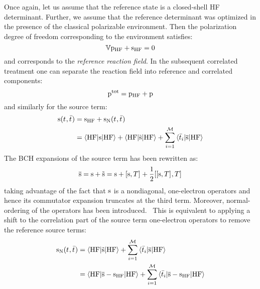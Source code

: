 Once again, let us assume that the reference state is a closed-shell
\acrshort{HF} determinant. Further, we assume that the reference determinant
was optimized in the presence of the classical polarizable environment.
Then the polarization degree of freedom corresponding to the environment
satisfies:
\begin{equation}
  \mathbb{V}\mathrm{p}_\mathrm{HF} + \mathrm{s}_\mathrm{HF} = 0
\end{equation}
and corresponds to the \emph{reference reaction field}.
In the subsequent correlated treatment one can separate the reaction
field into reference and correlated components:
\begin{equation}
  \mathrm{p}^\mathrm{tot} = \mathrm{p}_\mathrm{HF} + \mathrm{p}
\end{equation}
and similarly for the source term:
\begin{equation}
  \begin{aligned}
\mathrm{s}(t_{}, \bar{t}_{}) &= \mathrm{s}_\mathrm{HF} + \mathrm{s}_{\mathrm{N}}(t_{}, \bar{t}_{}) \\
                     &=
    \braket{\mathrm{HF} | \mathrm{s} | \mathrm{HF}}
  + \braket{\mathrm{HF} | \tilde{\mathrm{s}} | \mathrm{HF}}
  + \sum_{i=1}^{\mathcal{M}}\braket{\bar{t}_{i} | \overline{\mathrm{s}} | \mathrm{HF}}
  \end{aligned}
\end{equation}
The \acrshort{BCH} expansions of the source term has been rewritten as:
\begin{equation}
  \overline{\mathrm{s}} = \mathrm{s} + \tilde{\mathrm{s}} = \mathrm{s} + [ \mathrm{s}, T ]^{}
  + \frac{1}{2}[ [ \mathrm{s}, T ]^{}, T ]^{}
\end{equation}
taking advantage of the fact that $\mathrm{s}$ is a
nondiagonal, one-electron operators and hence its commutator
expansion truncates at the third term. Moreover, normal-ordering of the
operators has been introduced.~\autocite{Crawford2000-ey, Shavitt2009-mr}
This is equivalent to applying a shift to the correlation part of the
source term one-electron operators to remove the reference source terms:
\begin{equation}
  \begin{aligned}
    \mathrm{s}_{\mathrm{N}}(t_{}, \bar{t}_{})
  &=
   \braket{\mathrm{HF} | \tilde{\mathrm{s}} | \mathrm{HF}}
  + \sum_{i=1}^{\mathcal{M}}\braket{\bar{t}_{i} | \overline{\mathrm{s}} | \mathrm{HF}} \\
  &=
    \braket{\mathrm{HF} | \overline{\mathrm{s}} - \mathrm{s}_\mathrm{HF} | \mathrm{HF}}
  + \sum_{i=1}^{\mathcal{M}}\braket{\bar{t}_{i} | \overline{\mathrm{s}} - \mathrm{s}_\mathrm{HF} | \mathrm{HF}}
  \end{aligned}
\end{equation}

